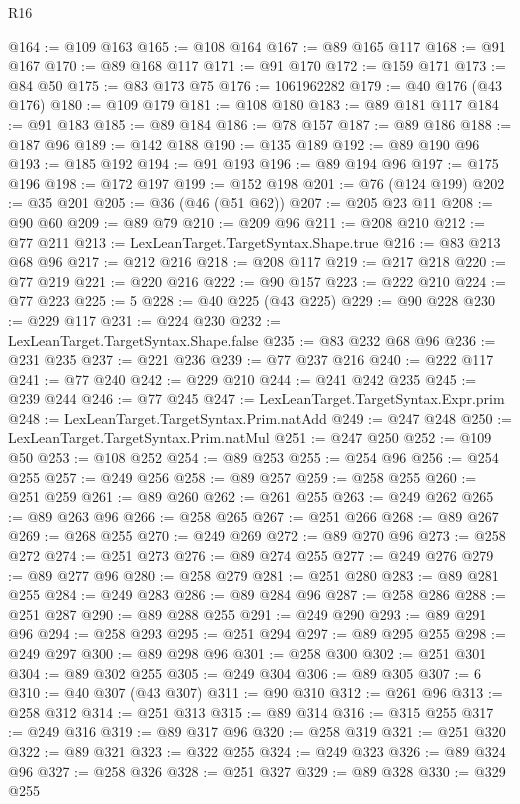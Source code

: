 \begin{lexlean}{R16}
\begin{coremodule}
@164 := @109 @163
@165 := @108 @164
@167 := @89 @165 @117
@168 := @91 @167
@170 := @89 @168 @117
@171 := @91 @170
@172 := @159 @171
@173 := @84 @50
@175 := @83 @173 @75
@176 := 1061962282
@179 := @40 @176 (@43 @176)
@180 := @109 @179
@181 := @108 @180
@183 := @89 @181 @117
@184 := @91 @183
@185 := @89 @184
@186 := @78 @157
@187 := @89 @186
@188 := @187 @96
@189 := @142 @188
@190 := @135 @189
@192 := @89 @190 @96
@193 := @185 @192
@194 := @91 @193
@196 := @89 @194 @96
@197 := @175 @196
@198 := @172 @197
@199 := @152 @198
@201 := @76 (@124 @199)
@202 := @35 @201
@205 := @36 (@46 (@51 @62))
@207 := @205 @23 @11
@208 := @90 @60
@209 := @89 @79
@210 := @209 @96
@211 := @208 @210
@212 := @77 @211
@213 := LexLeanTarget.TargetSyntax.Shape.true
@216 := @83 @213 @68 @96
@217 := @212 @216
@218 := @208 @117
@219 := @217 @218
@220 := @77 @219
@221 := @220 @216
@222 := @90 @157
@223 := @222 @210
@224 := @77 @223
@225 := 5
@228 := @40 @225 (@43 @225)
@229 := @90 @228
@230 := @229 @117
@231 := @224 @230
@232 := LexLeanTarget.TargetSyntax.Shape.false
@235 := @83 @232 @68 @96
@236 := @231 @235
@237 := @221 @236
@239 := @77 @237 @216
@240 := @222 @117
@241 := @77 @240
@242 := @229 @210
@244 := @241 @242 @235
@245 := @239 @244
@246 := @77 @245
@247 := LexLeanTarget.TargetSyntax.Expr.prim
@248 := LexLeanTarget.TargetSyntax.Prim.natAdd
@249 := @247 @248
@250 := LexLeanTarget.TargetSyntax.Prim.natMul
@251 := @247 @250
@252 := @109 @50
@253 := @108 @252
@254 := @89 @253
@255 := @254 @96
@256 := @254 @255
@257 := @249 @256
@258 := @89 @257
@259 := @258 @255
@260 := @251 @259
@261 := @89 @260
@262 := @261 @255
@263 := @249 @262
@265 := @89 @263 @96
@266 := @258 @265
@267 := @251 @266
@268 := @89 @267
@269 := @268 @255
@270 := @249 @269
@272 := @89 @270 @96
@273 := @258 @272
@274 := @251 @273
@276 := @89 @274 @255
@277 := @249 @276
@279 := @89 @277 @96
@280 := @258 @279
@281 := @251 @280
@283 := @89 @281 @255
@284 := @249 @283
@286 := @89 @284 @96
@287 := @258 @286
@288 := @251 @287
@290 := @89 @288 @255
@291 := @249 @290
@293 := @89 @291 @96
@294 := @258 @293
@295 := @251 @294
@297 := @89 @295 @255
@298 := @249 @297
@300 := @89 @298 @96
@301 := @258 @300
@302 := @251 @301
@304 := @89 @302 @255
@305 := @249 @304
@306 := @89 @305
@307 := 6
@310 := @40 @307 (@43 @307)
@311 := @90 @310
@312 := @261 @96
@313 := @258 @312
@314 := @251 @313
@315 := @89 @314
@316 := @315 @255
@317 := @249 @316
@319 := @89 @317 @96
@320 := @258 @319
@321 := @251 @320
@322 := @89 @321
@323 := @322 @255
@324 := @249 @323
@326 := @89 @324 @96
@327 := @258 @326
@328 := @251 @327
@329 := @89 @328
@330 := @329 @255

\end{coremodule}
\end{lexlean}
